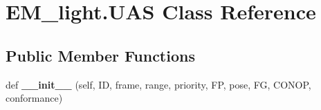 \hypertarget{classEM__light_1_1UAS}{}\section{E\+M\+\_\+light.\+U\+AS Class Reference}
\label{classEM__light_1_1UAS}
\subsection*{Public Member Functions}
\begin{DoxyCompactItemize}
\item 
def {\bfseries \+\_\+\+\_\+init\+\_\+\+\_\+} (self, ID, frame, range, priority, FP, pose, FG, C\+O\+N\+OP, conformance)\hypertarget{classEM__light_1_1UAS_a97118f4556330f5557b06996410943b9}{}\label{classEM__light_1_1UAS_a97118f4556330f5557b06996410943b9}

\end{DoxyCompactItemize}

